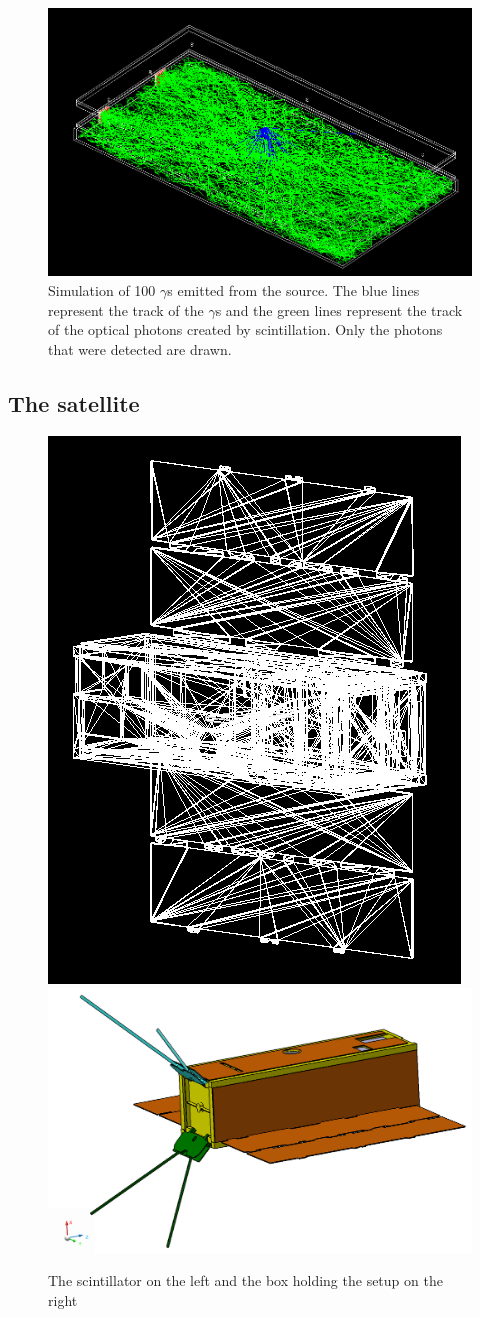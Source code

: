 \documentclass[12pt, a4paper,titlepage]{article}
\numberwithin{equation}{section}
\numberwithin{figure}{section}
\begin{document}
\begin{figure}[H]
\centering
\includegraphics[width=160.0mm]{images/2channel.png}
\caption{Simulation of 100 $\gamma$s emitted from the source. The blue lines represent the track of the $\gamma$s and the green lines represent the track of the optical photons created by scintillation. Only the photons that were detected are drawn.}
\end{figure}

\subsection{The satellite}



\begin{figure}[htbp]
 \centering %
 \includegraphics[width=.3\textwidth,origin=c,angle=0]{images/satellite.png}
 \qquad
 \includegraphics[width=.5\textwidth,origin=c,angle=90]{images/cad_sat.png} 
 \caption{\label{fig:i} The scintillator on the left and the box holding the setup on the right}
 \end{figure}
\end{document}
